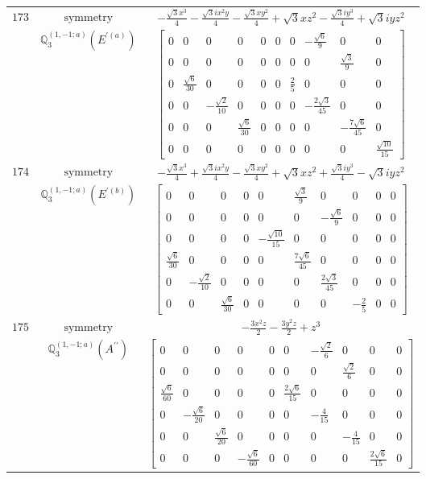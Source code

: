 \documentclass[fleqn,8pt,landscape]{jsarticle}
\begin{document}
\begin{longtable}{ccc}
$ 173 $ & $ \text{symmetry} $ & $ - \frac{\sqrt{3} x^{3}}{4} - \frac{\sqrt{3} i x^{2} y}{4} - \frac{\sqrt{3} x y^{2}}{4} + \sqrt{3} x z^{2} - \frac{\sqrt{3} i y^{3}}{4} + \sqrt{3} i y z^{2} $ \\
$  $ & $ \mathbb{Q}_{3}^{(1,-1;a)}(E^{\prime(a)}) $ & $ \begin{bmatrix} 0 & 0 & 0 & 0 & 0 & 0 & 0 & - \frac{\sqrt{6}}{9} & 0 & 0 \\ 0 & 0 & 0 & 0 & 0 & 0 & 0 & 0 & \frac{\sqrt{3}}{9} & 0 \\ 0 & \frac{\sqrt{6}}{30} & 0 & 0 & 0 & 0 & \frac{2}{5} & 0 & 0 & 0 \\ 0 & 0 & - \frac{\sqrt{2}}{10} & 0 & 0 & 0 & 0 & - \frac{2 \sqrt{3}}{45} & 0 & 0 \\ 0 & 0 & 0 & \frac{\sqrt{6}}{30} & 0 & 0 & 0 & 0 & - \frac{7 \sqrt{6}}{45} & 0 \\ 0 & 0 & 0 & 0 & 0 & 0 & 0 & 0 & 0 & \frac{\sqrt{10}}{15} \end{bmatrix} $ \\ \hline
$ 174 $ & $ \text{symmetry} $ & $ - \frac{\sqrt{3} x^{3}}{4} + \frac{\sqrt{3} i x^{2} y}{4} - \frac{\sqrt{3} x y^{2}}{4} + \sqrt{3} x z^{2} + \frac{\sqrt{3} i y^{3}}{4} - \sqrt{3} i y z^{2} $ \\
$  $ & $ \mathbb{Q}_{3}^{(1,-1;a)}(E^{\prime(b)}) $ & $ \begin{bmatrix} 0 & 0 & 0 & 0 & 0 & \frac{\sqrt{3}}{9} & 0 & 0 & 0 & 0 \\ 0 & 0 & 0 & 0 & 0 & 0 & - \frac{\sqrt{6}}{9} & 0 & 0 & 0 \\ 0 & 0 & 0 & 0 & - \frac{\sqrt{10}}{15} & 0 & 0 & 0 & 0 & 0 \\ \frac{\sqrt{6}}{30} & 0 & 0 & 0 & 0 & \frac{7 \sqrt{6}}{45} & 0 & 0 & 0 & 0 \\ 0 & - \frac{\sqrt{2}}{10} & 0 & 0 & 0 & 0 & \frac{2 \sqrt{3}}{45} & 0 & 0 & 0 \\ 0 & 0 & \frac{\sqrt{6}}{30} & 0 & 0 & 0 & 0 & - \frac{2}{5} & 0 & 0 \end{bmatrix} $ \\ \hline
$ 175 $ & $ \text{symmetry} $ & $ - \frac{3 x^{2} z}{2} - \frac{3 y^{2} z}{2} + z^{3} $ \\
$  $ & $ \mathbb{Q}_{3}^{(1,-1;a)}(A^{\prime\prime}) $ & $ \begin{bmatrix} 0 & 0 & 0 & 0 & 0 & 0 & - \frac{\sqrt{2}}{6} & 0 & 0 & 0 \\ 0 & 0 & 0 & 0 & 0 & 0 & 0 & \frac{\sqrt{2}}{6} & 0 & 0 \\ \frac{\sqrt{6}}{60} & 0 & 0 & 0 & 0 & \frac{2 \sqrt{6}}{15} & 0 & 0 & 0 & 0 \\ 0 & - \frac{\sqrt{6}}{20} & 0 & 0 & 0 & 0 & - \frac{4}{15} & 0 & 0 & 0 \\ 0 & 0 & \frac{\sqrt{6}}{20} & 0 & 0 & 0 & 0 & - \frac{4}{15} & 0 & 0 \\ 0 & 0 & 0 & - \frac{\sqrt{6}}{60} & 0 & 0 & 0 & 0 & \frac{2 \sqrt{6}}{15} & 0 \end{bmatrix} $ \\ \hline

\end{longtable}
\end{document}
